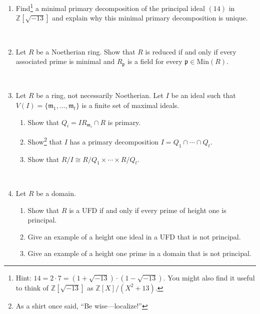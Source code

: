 \documentclass[12pt]{amsart}
\newcommand{\Z}{\mathbb{Z}}
\newcommand{\p}{\mathfrak{p}}
\newcommand{\m}{\mathfrak{m}}
\newcommand{\Min}{\mathrm{Min}}
\newcommand{\Ass}{\mathrm{Ass}}
\begin{document}
\begin{enumerate}

\item Find\footnote{Hint: $14=2\cdot 7 = (1+\sqrt{-13}) \cdot (1-\sqrt{-13})$. You might also find it useful to think of $\Z[\sqrt{-13}]$ as $\Z[X]/(X^2+13)$.} a minimal primary decomposition of the principal ideal $(14)$ in $\Z[\sqrt{-13}]$ and explain why this minimal primary decomposition is unique.

\

\item Let $R$ be a Noetherian ring. Show that $R$ is reduced if and only if every associated prime is minimal and $R_\p$ is a field for every $\p\in \Min(R)$.

\

\item Let $R$ be a ring, not necessarily Noetherian. Let $I$ be an ideal such that $V(I) = \{ \m_1,\ldots,\m_t \}$ is a finite set of maximal ideals. 
	\begin{enumerate}
		\item Show that $Q_i = I R_{\m_i} \cap R$ is primary.
		\item Show\footnote{As a shirt once said, ``Be wise---localize!''} that $I$ has a primary decomposition $I=Q_1 \cap \cdots \cap Q_t$.
		\item Show that $R/I \cong R/Q_1 \times \cdots \times R/Q_t$.
	\end{enumerate}


\


\item Let $R$ be a domain. 
\begin{enumerate}
\item Show that $R$ is a UFD if and only if every prime of height one is principal.
\item Give an example of a height one ideal in a UFD that is not principal.
\item Give an example of a height one prime in a domain that is not principal.
\end{enumerate}



\end{enumerate}
\end{document}
